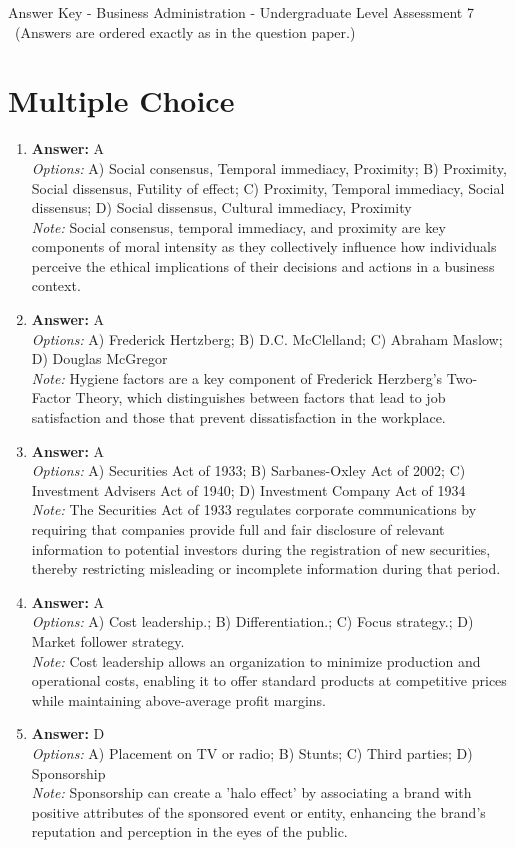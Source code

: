 \documentclass[12pt]{article}
\begin{document}
\begin{center}
Answer Key - Business Administration - Undergraduate Level Assessment 7 \
\small (Answers are ordered exactly as in the question paper.)
\end{center}

\section*{Multiple Choice}
\begin{enumerate}[label=\arabic*.]
\item \textbf{Answer:} A
\\ \textit{Options:} A) Social consensus, Temporal immediacy, Proximity; B) Proximity, Social dissensus, Futility of effect; C) Proximity, Temporal immediacy, Social dissensus; D) Social dissensus, Cultural immediacy, Proximity
\\ \textit{Note:} Social consensus, temporal immediacy, and proximity are key components of moral intensity as they collectively influence how individuals perceive the ethical implications of their decisions and actions in a business context.
\item \textbf{Answer:} A
\\ \textit{Options:} A) Frederick Hertzberg; B) D.C. McClelland; C) Abraham Maslow; D) Douglas McGregor
\\ \textit{Note:} Hygiene factors are a key component of Frederick Herzberg's Two-Factor Theory, which distinguishes between factors that lead to job satisfaction and those that prevent dissatisfaction in the workplace.
\item \textbf{Answer:} A
\\ \textit{Options:} A) Securities Act of 1933; B) Sarbanes-Oxley Act of 2002; C) Investment Advisers Act of 1940; D) Investment Company Act of 1934
\\ \textit{Note:} The Securities Act of 1933 regulates corporate communications by requiring that companies provide full and fair disclosure of relevant information to potential investors during the registration of new securities, thereby restricting misleading or incomplete information during that period.
\item \textbf{Answer:} A
\\ \textit{Options:} A) Cost leadership.; B) Differentiation.; C) Focus strategy.; D) Market follower strategy.
\\ \textit{Note:} Cost leadership allows an organization to minimize production and operational costs, enabling it to offer standard products at competitive prices while maintaining above-average profit margins.
\item \textbf{Answer:} D
\\ \textit{Options:} A) Placement on TV or radio; B) Stunts; C) Third parties; D) Sponsorship
\\ \textit{Note:} Sponsorship can create a 'halo effect' by associating a brand with positive attributes of the sponsored event or entity, enhancing the brand's reputation and perception in the eyes of the public.
\end{enumerate}
\end{document}
